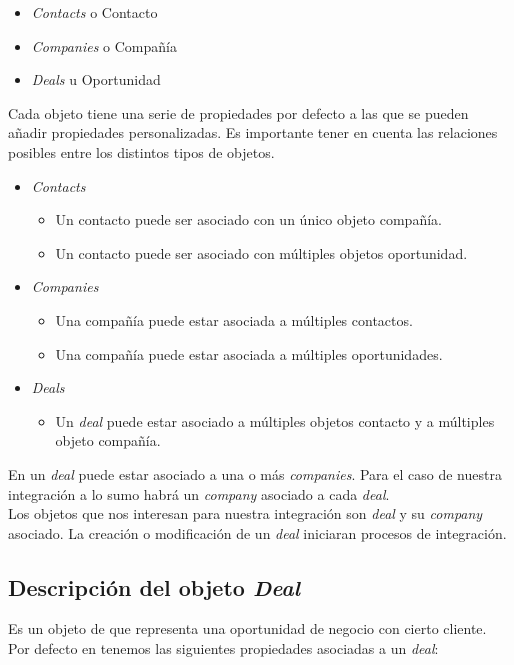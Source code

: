 \begin{itemize}
	\item \textit{Contacts} o Contacto
	\item \textit{Companies} o Compañía
	\item \textit{Deals} u Oportunidad
\end{itemize}

Cada objeto tiene una serie de propiedades por defecto a las que se pueden añadir propiedades personalizadas.
Es importante tener en cuenta las relaciones posibles entre los distintos tipos de objetos.

\begin{itemize}
	\item \textit{Contacts}
	\begin{itemize}
		\item Un contacto puede ser asociado con un único objeto compañía.
		\item Un contacto puede ser asociado con múltiples objetos oportunidad.
	\end{itemize}
	\item \textit{Companies}
	\begin{itemize}
		\item Una compañía puede estar asociada a múltiples contactos.
		\item Una compañía puede estar asociada a múltiples oportunidades.
	\end{itemize}
	\item \textit{Deals}
	\begin{itemize}
		\item Un \textit{deal} puede estar asociado a múltiples objetos contacto y a múltiples objeto compañía.
	\end{itemize}
\end{itemize}

En \hs{} un \textit{deal} puede estar asociado a una o más \textit{companies}. Para el caso de nuestra integración a lo sumo habrá un \textit{company} asociado a cada \textit{deal}.\\

Los objetos que nos interesan para nuestra integración son \textit{deal} y su \textit{company} asociado. La creación o modificación de un \textit{deal} iniciaran procesos de integración.



\subsection{Descripción del objeto \textit{Deal}}
	Es un objeto de \hs{} que representa una oportunidad de negocio con cierto cliente. Por defecto en \hs{} tenemos las siguientes propiedades asociadas a un \textit{deal}:	

